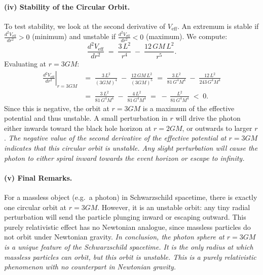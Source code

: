 \documentclass{article}
\begin{document}
\paragraph{(iv) Stability of the Circular Orbit.}
To test stability, we look at the second derivative of \(V_\mathrm{eff}\). An extremum is stable if \(\tfrac{d^2V_\mathrm{eff}}{dr^2} > 0\) (minimum) and unstable if \(\tfrac{d^2V_\mathrm{eff}}{dr^2} < 0\) (maximum). We compute:
\begin{equation*}
\frac{d^2V_\mathrm{eff}}{dr^2}
\;=\;
\frac{3\,L^2}{r^4}
\;-\;
\frac{12\,GM\,L^2}{r^5}.
\end{equation*}
Evaluating at \(r = 3GM\):
\begin{align}
\left.\frac{d^2V_\mathrm{eff}}{dr^2}\right|_{r=3GM}
&=\;
\frac{3\,L^2}{(3GM)^4}
\;-\;
\frac{12\,GM\,L^2}{(3GM)^5}
\;=\;
\frac{3\,L^2}{81\,G^4M^4}
\;-\;
\frac{12\,L^2}{243\,G^4M^4}
\nonumber\\
&=\;
\frac{3\,L^2}{81\,G^4M^4}
\;-\;
\frac{4\,L^2}{81\,G^4M^4}
\;=\;
-\,\frac{L^2}{81\,G^4M^4}
\;<\;0.
\end{align}
Since this is negative, the orbit at \(r=3GM\) is a maximum of the effective potential and thus unstable. A small perturbation in \(r\) will drive the photon either inwards toward the black hole horizon at \(r=2GM\), or outwards to larger \(r\).
\textit{The negative value of the second derivative of the effective potential at $r=3GM$ indicates that this circular orbit is unstable. Any slight perturbation will cause the photon to either spiral inward towards the event horizon or escape to infinity.}

\paragraph{(v) Final Remarks.}
For a massless object (e.g.\ a photon) in Schwarzschild spacetime, there is exactly one circular orbit at \(r=3GM\). However, it is an unstable orbit: any tiny radial perturbation will send the particle plunging inward or escaping outward. This purely relativistic effect has no Newtonian analogue, since massless particles do not orbit under Newtonian gravity.
\textit{In conclusion, the photon sphere at $r=3GM$ is a unique feature of the Schwarzschild spacetime. It is the only radius at which massless particles can orbit, but this orbit is unstable. This is a purely relativistic phenomenon with no counterpart in Newtonian gravity.}

\pagebreak
\end{document}
